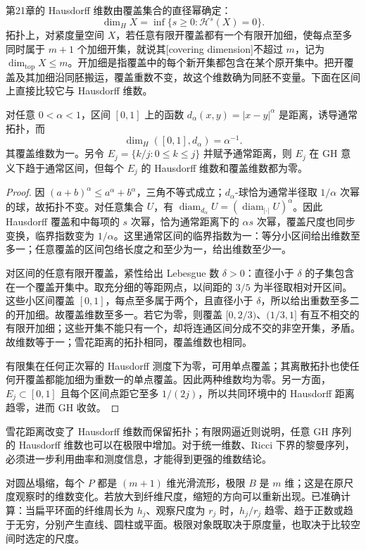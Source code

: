 \ProseParagraphBreak
第21章的 Hausdorff 维数由覆盖集合的直径幂确定：
\[
	\dim_H X=\inf\{s\ge0:\mathcal H^s(X)=0\}.
\]
拓扑上，对紧度量空间 \(X\)，若任意有限开覆盖都有一个有限开加细，使每点至多同时属于 \(m+1\) 个加细开集，就说其[covering dimension]不超过 \(m\)，记为 \(\dim_{\mathrm{top}}X\le m\)。开加细是指覆盖中的每个新开集都包含在某个原开集中。把开覆盖及其加细沿同胚搬运，覆盖重数不变，故这个维数确为同胚不变量。下面在区间上直接比较它与 Hausdorff 维数。

\begin{proposition}\label{g3:prop:gh-snowflake-dimension}
	对任意 \(0<\alpha<1\)，区间 \([0,1]\) 上的函数 \(d_\alpha(x,y)=|x-y|^\alpha\) 是距离，诱导通常拓扑，而
	\[
		\dim_H([0,1],d_\alpha)=\alpha^{-1}.
	\]
	其覆盖维数为一。另令 \(E_j=\{k/j:0\le k\le j\}\) 并赋予通常距离，则 \(E_j\) 在 GH 意义下趋于通常区间，但每个 \(E_j\) 的 Hausdorff 维数和覆盖维数都为零。
\end{proposition}
\begin{proof}
	因 \((a+b)^\alpha\le a^\alpha+b^\alpha\)，三角不等式成立；\(d_\alpha\)-球恰为通常半径取 \(1/\alpha\) 次幂的球，故拓扑不变。对任意集合 \(U\)，有 \(\operatorname{diam}_{d_\alpha}U=(\operatorname{diam}_{|\cdot|}U)^\alpha\)。因此 Hausdorff 覆盖和中每项的 \(s\) 次幂，恰为通常距离下的 \(\alpha s\) 次幂，覆盖尺度也同步变换，临界指数变为 \(1/\alpha\)。这里通常区间的临界指数为一：等分小区间给出维数至多一；任意覆盖的区间包络长度之和至少为一，给出维数至少一。

	对区间的任意有限开覆盖，紧性给出 Lebesgue 数 \(\delta>0\)：直径小于 \(\delta\) 的子集包含在一个覆盖开集中。取充分细的等距网点，以间距的 \(3/5\) 为半径取相对开区间。这些小区间覆盖 \([0,1]\)，每点至多属于两个，且直径小于 \(\delta\)，所以给出重数至多二的开加细。故覆盖维数至多一。若它为零，则覆盖 \([0,2/3)\)、\((1/3,1]\) 有互不相交的有限开加细；这些开集不能只有一个，却将连通区间分成不交的非空开集，矛盾。故维数等于一；雪花距离的拓扑相同，覆盖维数也相同。

	有限集在任何正次幂的 Hausdorff 测度下为零，可用单点覆盖；其离散拓扑也使任何开覆盖都能加细为重数一的单点覆盖。因此两种维数均为零。另一方面，\(E_j\subset[0,1]\) 且每个区间点距它至多 \(1/(2j)\)，所以共同环境中的 Hausdorff 距离趋零，进而 GH 收敛。
\end{proof}

雪花距离改变了 Hausdorff 维数而保留拓扑；有限网逼近则说明，任意 GH 序列的 Hausdorff 维数也可以在极限中增加。对于统一维数、Ricci 下界的黎曼序列，必须进一步利用曲率和测度信息，才能得到更强的维数结论。

\ProseParagraphBreak
对圆丛塌缩，每个 \(P\) 都是 \((m+1)\) 维光滑流形，极限 \(B\) 是 \(m\) 维；这是在原尺度观察时的维数变化。若放大到纤维尺度，缩短的方向可以重新出现。已准确计算：当扁平环面的纤维周长为 \(h_j\)、观察尺度为 \(r_j\) 时，\(h_j/r_j\) 趋零、趋于正数或趋于无穷，分别产生直线、圆柱或平面。极限对象既取决于原度量，也取决于比较空间时选定的尺度。
